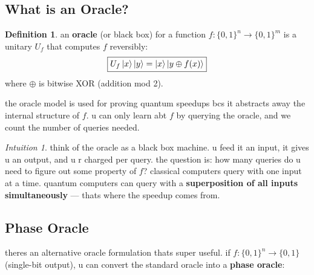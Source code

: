 \documentclass[11pt,a4paper]{article}
\theoremstyle{definition}
\newtheorem{definition}{Definition}[section]
\theoremstyle{remark}
\newtheorem*{intuition}{Intuition}
\begin{document}
\subsection{What is an Oracle?}

\begin{definition}
an \textbf{oracle} (or black box) for a function $f: \{0,1\}^n \to \{0,1\}^m$ is a unitary $U_f$ that computes $f$ reversibly:
\[
\boxed{U_f\ket{x}\ket{y} = \ket{x}\ket{y \oplus f(x)}}
\]
where $\oplus$ is bitwise XOR (addition mod 2).
\end{definition}

the oracle model is used for proving quantum speedups bcs it abstracts away the internal structure of $f$. u can only learn abt $f$ by querying the oracle, and we count the number of queries needed.

\begin{center}
\end{center}

\begin{intuition}
think of the oracle as a black box machine. u feed it an input, it gives u an output, and u r charged per query. the question is: how many queries do u need to figure out some property of $f$? classical computers query with one input at a time. quantum computers can query with a \textbf{superposition of all inputs simultaneously} --- thats where the speedup comes from.
\end{intuition}

\subsection{Phase Oracle}

theres an alternative oracle formulation thats super useful. if $f: \{0,1\}^n \to \{0,1\}$ (single-bit output), u can convert the standard oracle into a \textbf{phase oracle}:
\end{document}
